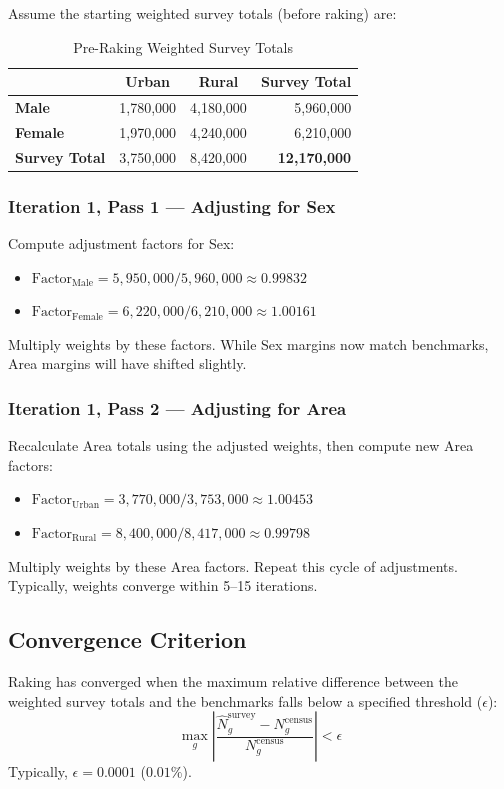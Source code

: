 \documentclass[11pt,a4paper]{article}
\begin{document}
\newpage

Assume the starting weighted survey totals (before raking) are:

\begin{table}[htbp]
  \centering
  \caption{Pre-Raking Weighted Survey Totals}
  \label{tab:prerake_totals}
  \begin{tabular}{lccr}
    \toprule
    & \textbf{Urban} & \textbf{Rural} & \textbf{Survey Total} \\
    \midrule
    \textbf{Male} & 1,780,000 & 4,180,000 & 5,960,000 \\
    \textbf{Female} & 1,970,000 & 4,240,000 & 6,210,000 \\
    \midrule
    \textbf{Survey Total} & 3,750,000 & 8,420,000 & \textbf{12,170,000} \\
    \bottomrule
  \end{tabular}
\end{table}

\subsubsection{Iteration 1, Pass 1 --- Adjusting for Sex}
Compute adjustment factors for Sex:
\begin{itemize}
  \item $\text{Factor}_{\text{Male}} = 5,950,000 / 5,960,000 \approx 0.99832$
  \item $\text{Factor}_{\text{Female}} = 6,220,000 / 6,210,000 \approx 1.00161$
\end{itemize}
Multiply weights by these factors. While Sex margins now match benchmarks, Area margins will have shifted slightly.

\subsubsection{Iteration 1, Pass 2 --- Adjusting for Area}
Recalculate Area totals using the adjusted weights, then compute new Area factors:
\begin{itemize}
  \item $\text{Factor}_{\text{Urban}} = 3,770,000 / 3,753,000 \approx 1.00453$
  \item $\text{Factor}_{\text{Rural}} = 8,400,000 / 8,417,000 \approx 0.99798$
\end{itemize}
Multiply weights by these Area factors. Repeat this cycle of adjustments. Typically, weights converge within 5--15 iterations.

\subsection{Convergence Criterion}
Raking has converged when the maximum relative difference between the weighted survey totals and the benchmarks falls below a specified threshold ($\epsilon$):
\begin{equation}
  \max_g \left| \frac{\hat{N}_g^{\text{survey}} - N_g^{\text{census}}}{N_g^{\text{census}}} \right| < \epsilon
\end{equation}
Typically, $\epsilon = 0.0001$ ($0.01\%$).
\end{document}
